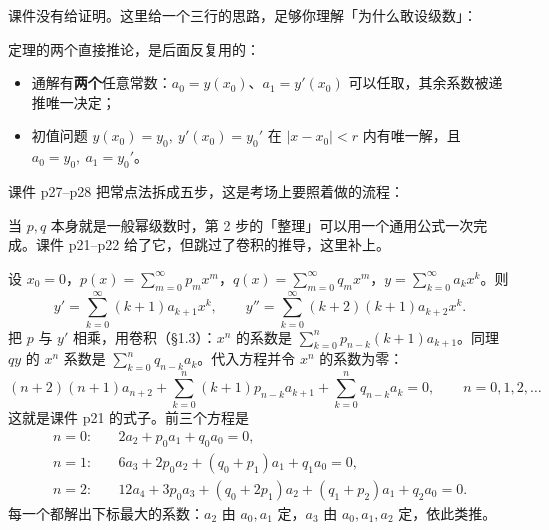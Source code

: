 \documentclass[11pt]{ctexart}
\let\origsubhdr\subhdr
\renewcommand{\subhdr}[1]{\needspace{3\baselineskip}\origsubhdr{#1}}
\begin{document}
课件没有给证明。这里给一个三行的思路，足够你理解「为什么敢设级数」：


定理的两个直接推论，是后面反复用的：
\begin{itemize}
  \item 通解有\textbf{两个}任意常数：$a_0=y(x_0)$、$a_1=y'(x_0)$ 可以任取，其余系数被递推唯一决定；
  \item 初值问题 $y(x_0)=y_0,\ y'(x_0)=y_0'$ 在 $|x-x_0|<r$ 内有唯一解，且 $a_0=y_0,\ a_1=y_0'$。
\end{itemize}


课件 p27--p28 把常点法拆成五步，这是考场上要照着做的流程：


当 $p,q$ 本身就是一般幂级数时，第 2 步的「整理」可以用一个通用公式一次完成。课件 p21--p22 给了它，但跳过了卷积的推导，这里补上。

设 $x_0=0$，$p(x)=\sum_{m=0}^\infty p_mx^m$，$q(x)=\sum_{m=0}^\infty q_mx^m$，$y=\sum_{k=0}^\infty a_kx^k$。则
\[
y'=\sum_{k=0}^{\infty}(k+1)a_{k+1}x^k,\qquad
y''=\sum_{k=0}^{\infty}(k+2)(k+1)a_{k+2}x^k .
\]
把 $p$ 与 $y'$ 相乘，用卷积（§1.3）：$x^n$ 的系数是 $\sum_{k=0}^{n}p_{n-k}(k+1)a_{k+1}$。同理 $qy$ 的 $x^n$ 系数是 $\sum_{k=0}^{n}q_{n-k}a_k$。代入方程并令 $x^n$ 的系数为零：
\[
(n+2)(n+1)a_{n+2}+\sum_{k=0}^{n}(k+1)p_{n-k}a_{k+1}+\sum_{k=0}^{n}q_{n-k}a_k=0,
\qquad n=0,1,2,\dots \tag{2.1}
\]
这就是课件 p21 的式子。前三个方程是
\begin{align*}
n=0:\quad & 2a_2+p_0a_1+q_0a_0=0,\\
n=1:\quad & 6a_3+2p_0a_2+(q_0+p_1)a_1+q_1a_0=0,\\
n=2:\quad & 12a_4+3p_0a_3+(q_0+2p_1)a_2+(q_1+p_2)a_1+q_2a_0=0 .
\end{align*}
每一个都解出下标最大的系数：$a_2$ 由 $a_0,a_1$ 定，$a_3$ 由 $a_0,a_1,a_2$ 定，依此类推。
\end{document}
